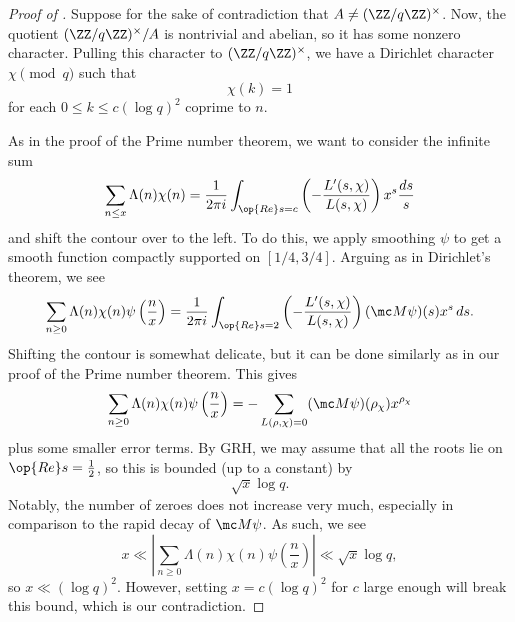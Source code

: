 \documentclass[../notes.tex]{subfiles}
\begin{document}
\begin{proof}[Proof of ]
	Suppose for the sake of contradiction that $A\ne(\ZZ/q\ZZ)^\times$. Now, the quotient $(\ZZ/q\ZZ)^\times/A$ is nontrivial and abelian, so it has some nonzero character. Pulling this character to $(\ZZ/q\ZZ)^\times$, we have a Dirichlet character $\chi\pmod q$ such that
	\[\chi(k)=1\]
	for each $0\le k\le c(\log q)^2$ coprime to $n$.

	As in the proof of the Prime number theorem, we want to consider the infinite sum
	\[\sum_{n\le x}\Lambda(n)\chi(n)=\frac1{2\pi i}\int_{\op{Re}s=c}\left(-\frac{L'(s,\chi)}{L(s,\chi)}\right)x^s\frac{ds}s\]
	and shift the contour over to the left. To do this, we apply smoothing $\psi$ to get a smooth function compactly supported on $[1/4,3/4]$. Arguing as in Dirichlet's theorem, we see
	\[\sum_{n\ge0}\Lambda(n)\chi(n)\psi\left(\frac nx\right)=\frac1{2\pi i}\int_{\op{Re}s=2}\left(-\frac{L'(s,\chi)}{L(s,\chi)}\right)(\mc M\psi)(s)x^s\,ds.\]
	Shifting the contour is somewhat delicate, but it can be done similarly as in our proof of the Prime number theorem. This gives
	\[\sum_{n\ge0}\Lambda(n)\chi(n)\psi\left(\frac nx\right)=-\sum_{L(\rho,\chi)=0}(\mc M\psi)(\rho_\chi)x^{\rho_\chi}\]
	plus some smaller error terms. By GRH, we may assume that all the roots lie on $\op{Re}s=\frac12$, so this is bounded (up to a constant) by
	\[\sqrt x\log q.\]
	Notably, the number of zeroes does not increase very much, especially in comparison to the rapid decay of $\mc M\psi$. As such, we see
	\[x\ll\left|\sum_{n\ge0}\Lambda(n)\chi(n)\psi\left(\frac nx\right)\right|\ll\sqrt x\log q,\]
	so $x\ll(\log q)^2$. However, setting $x=c(\log q)^2$ for $c$ large enough will break this bound, which is our contradiction.
\end{proof}
\end{document}
